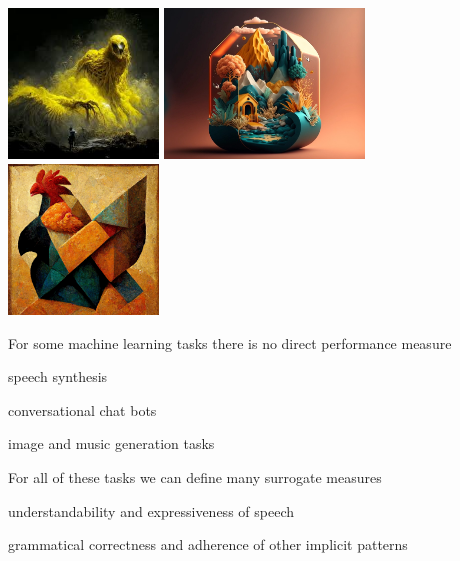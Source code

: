 \documentclass[landscape,footrule]{foils}
\begin{document}
\titlefoil


\centerline{
\includegraphics[height=4cm]{midjourney_01}\hspace*{0.5cm}
\includegraphics[height=4cm]{midjourney_02}\hspace*{0.5cm}
\includegraphics[height=4cm]{midjourney_03}\hspace*{0.5cm}
}

For some machine learning tasks there is no direct performance measure
\begin{triangles}
\item speech synthesis
\item conversational chat bots
\item image and music generation tasks
\end{triangles}
\vspace*{1cm}

For all of these tasks we can define many surrogate measures
\begin{triangles}
\item understandability and expressiveness of speech
\item grammatical correctness and adherence of other implicit patterns  
\end{triangles}   
\end{document}
